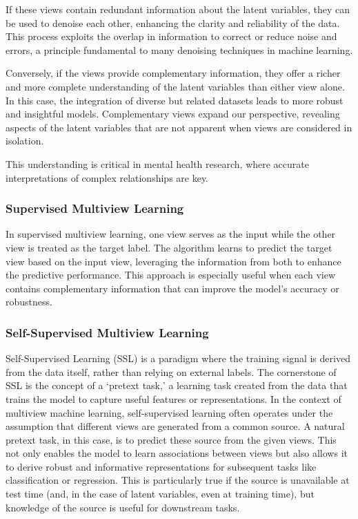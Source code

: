 If these \gls{views} contain redundant information about the latent variables, they can be used to denoise each other, enhancing the clarity and reliability of the data.
This process exploits the overlap in information to correct or reduce noise and errors, a principle fundamental to many denoising techniques in machine learning.

Conversely, if the \gls{views} provide complementary information, they offer a richer and more complete understanding of the latent variables than either view alone.
In this case, the integration of diverse but related datasets leads to more robust and insightful models.
Complementary \gls{views} expand our perspective, revealing aspects of the latent variables that are not apparent when \gls{views} are considered in isolation.

This understanding is critical in mental health research, where accurate interpretations of complex relationships are key.


\subsubsection{Supervised Multiview Learning}

In supervised multiview learning, one view serves as the input while the other view is treated as the target label.
The algorithm learns to predict the target view based on the input view, leveraging the information from both to enhance the predictive performance.
This approach is especially useful when each view contains complementary information that can improve the model's accuracy or robustness.

\subsubsection{Self-Supervised Multiview Learning}

Self-Supervised Learning (SSL) is a paradigm where the training signal is derived from the data itself, rather than relying on external labels.
The cornerstone of SSL is the concept of a `pretext task,' a learning task created from the data that trains the model to capture useful features or representations.
In the context of multiview machine learning, self-supervised learning often operates under the assumption that different \gls{views} are generated from a common source.
A natural pretext task, in this case, is to predict these source from the given \gls{views}.
This not only enables the model to learn associations between \gls{views} but also allows it to derive robust and informative representations for subsequent tasks like classification or regression.
This is particularly true if the source is unavailable at test time (and, in the case of latent variables, even at training time), but knowledge of the source is useful for downstream tasks.

